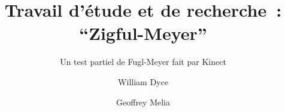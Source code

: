 \documentclass{beamer}
\title{Travail d'étude et de recherche~: ``Zigful-Meyer''}
\subtitle{Un test partiel de Fugl-Meyer fait par Kinect}
\author{William Dyce \and Geoffrey Melia}
\institute
{
  Université Montpellier 2
}
\date{}
\begin{document}
\begin{frame}[plain]
  \titlepage
\end{frame}



\begin{frame}
\tableofcontents[hideallsubsections]
\end{frame}








%











\end{document}

